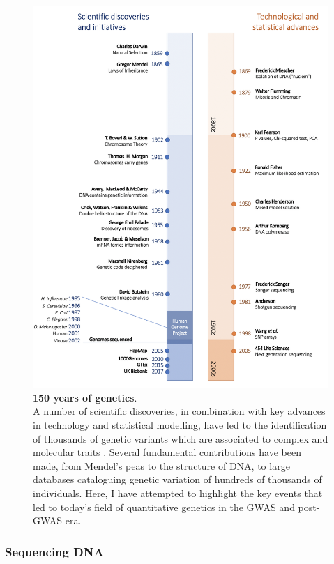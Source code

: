 \begin{figure}[htbp]
\centering
\includegraphics[width=15cm]{Chapter1/Fig/genetic_timeline_draft.png}
\caption[Genetic Timeline]{\textbf{150 years of genetics}.\\
A number of scientific discoveries, in combination with key advances in technology and statistical modelling, have led to the identification of thousands of genetic variants which are associated to complex and molecular traits \cite{nhgri2003genetic}.
Several fundamental contributions have been made, from Mendel's peas to the structure of DNA, to large databases cataloguing genetic variation of hundreds of thousands of individuals.
Here, I have attempted to highlight the key events that led to today's field of quantitative genetics in the GWAS and post-GWAS era.}
\label{fig:genetic_timeline}
\end{figure}

\subsubsection{Sequencing DNA}

